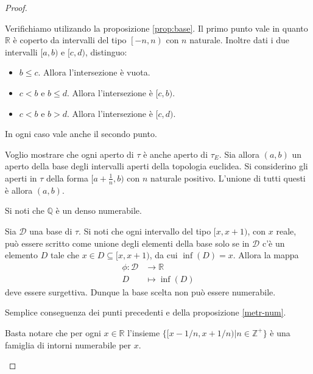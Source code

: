 \documentclass{article}
\begin{document}
\begin{proof}
    \begin{nlist}
        \item Verifichiamo utilizando la proposizione \ref{prop:base}. Il primo
        punto vale in quanto $\mathbb{R}$ \`e coperto da intervalli del tipo
        $\left[-n, n\right)$ con $n$ naturale. Inoltre dati i due intervalli
        $[a,b)$ e $[c,d)$, distinguo:
        \begin{itemize}
            \item $b\leq c$. Allora l'intersezione \`e vuota.
            \item $c < b$ e $b \leq d$. Allora l'intersezione \`e $[c,b)$.
            \item $c < b$ e $b > d$. Allora l'intersezione \`e $[c,d)$.
        \end{itemize}
        In ogni caso vale anche il secondo punto.

        \item Voglio mostrare che ogni aperto di $\tau$ \`e anche aperto di
        $\tau_E$. Sia allora $(a, b)$ un aperto della base degli intervalli
        aperti della topologia euclidea. Si considerino gli aperti in $\tau$
        della forma $[a+\frac{1}{n},b)$ con $n$ naturale positivo. L'unione di
        tutti questi \`e allora $(a,b)$.

        \item Si noti che $\mathbb{Q}$ \`e un denso numerabile.

        \item Sia $\mathcal{D}$ una base di $\tau$. Si noti che ogni intervallo
        del tipo $[x,x+1)$, con $x$ reale, pu\`o essere scritto come unione
        degli elementi della base solo se in $\mathcal{D}$ c'\`e un elemento $D$
        tale che $x \in D \subseteq [x, x+1)$, da cui $\inf(D) = x$. Allora la
        mappa
        \begin{align*}
            \phi:\mathcal{D}&\to \mathbb{R}\\
            D & \mapsto \inf(D)
        \end{align*}
        deve essere surgettiva. Dunque la base scelta non pu\`o essere
        numerabile.

        \item Semplice conseguenza dei punti precedenti e della proposizione
        \ref{metr-num}.

				\item Basta notare che per ogni $x \in \mathbb{R}$ l'insieme $\{
				[x-1/n, x+1/n) | n \in \mathbb{Z}^+\}$ è una famiglia di intorni
				numerabile per $x$.
    \end{nlist}
\end{proof}
\end{document}
